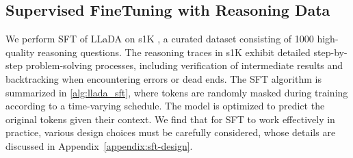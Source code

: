 \subsection{Supervised FineTuning with Reasoning Data}
\vspace{-2mm}
\label{sec:method_sft}
We perform SFT of LLaDA on s1K \citep{muennighoff2025s1}, a curated dataset consisting of 1000 high-quality reasoning questions. 
The reasoning traces in s1K exhibit detailed step-by-step problem-solving processes, including verification of intermediate results and backtracking when encountering errors or dead ends. 
The SFT algorithm is summarized in \cref{alg:llada_sft}, where tokens are randomly masked during training according to a time-varying schedule. The model is optimized to predict the original tokens given their context. We find that for SFT to work effectively in practice, various design choices must be carefully considered, whose details are discussed in Appendix~\ref{appendix:sft-design}.





